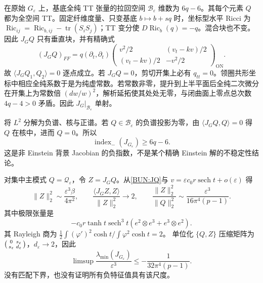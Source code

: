 \documentclass[UTF8,fontset=fandol,zihao=-4,oneside,openany]{ctexbook}
\theoremstyle{cjkplain}
\numberwithin{equation}{chapter}
\begin{document}
在原始 $G_\varepsilon$ 上，基底全纯 TT 张量的拉回空间
$\mathcal B_\varepsilon$ 维数为 $6q-6$。其每个元素 $Q$ 都为全空间 TT。固定纤维度量、只变基底 $b\mapsto b+s q$ 时，坐标型水平 Ricci 为
$\operatorname{Ric}_{ij}=\operatorname{Ric}_{b,ij}-\operatorname{tr}(S_iS_j)$；TT 变分使 $D\operatorname{Ric}_b(q)=-q$。混合块也不变。因此 $J_GQ$ 只有垂直块，并有精确式
\begin{equation}
 (J_GQ)_{FF}=q(\partial_t,\partial_t)
 \begin{pmatrix}v^2/2&(v_t-kv)/2\\(v_t-kv)/2&-v^2/2\end{pmatrix}_{\mathrm{ON}}.
 \label{BUN:JQ}
\end{equation}
故 $\langle J_GQ_1,Q_2\rangle=0$ 逐点成立。若 $J_GQ=0$，剪切开集上必有 $q_{tt}=0$。领圈共形坐标中相应全纯系数于是为纯虚常数。若常数非零，提升到上半平面后全纯二次微分在开集上为常数倍 $(dw/w)^2$，解析延拓使其处处无零，与闭曲面上零点总次数 $4q-4>0$ 矛盾。因此 $J_G|_{\mathcal B_\varepsilon}$ 单射。

将 $L^2$ 分解为负谱、核与正谱。若 $Q\in\mathcal B_\varepsilon$ 的负谱投影为零，由 $\langle J_GQ,Q\rangle=0$ 得 $Q$ 在核中，进而 $Q=0$。所以
\begin{equation}
 \operatorname{index}_-(J_{G_\varepsilon})\ge6q-6.
 \label{BUN:index}
\end{equation}
这是非 Einstein 背景 Jacobian 的负指数，不是某个精确 Einstein 解的不稳定性结论。

对集中主模式 $Q=\mathcal Q_\varepsilon$，令 $Z=J_GQ$。从\eqref{BUN:JQ}与 $v=\varepsilon c_0r\operatorname{sech}t+o(\varepsilon)$ 得
\[
 \|Z\|_2^2\sim\frac{\varepsilon^3\beta}{4\pi^2},\qquad
 \frac{\langle J_GZ,Z\rangle}{\|Z\|_2^2}\to2,
 \qquad \frac{\|Z\|_2^2}{\|Q\|_2^2}
 \sim\frac{\varepsilon^3}{16\pi^4(p-1)}.
\]
其中极限张量是
\[
 -c_0r\tanh t\operatorname{sech}^3t(e^2\otimes e^3+e^3\otimes e^2).
\]
其 Rayleigh 商为 $\frac12\int(\varphi')^2\cosh t/\int\varphi^2\cosh t=2$。
单位化 $\{Q,Z\}$ 压缩矩阵为
$\begin{psmallmatrix}0&s_\varepsilon\\s_\varepsilon&d_\varepsilon\end{psmallmatrix}$，$d_\varepsilon\to2$，因此
\begin{equation}
 \limsup\frac{\lambda_{\min}(J_{G_\varepsilon})}{\varepsilon^3}
 \le-\frac1{32\pi^4(p-1)}.
 \label{BUN:negative-ritz}
\end{equation}
没有匹配下界，也没有证明所有负特征值具有该尺度。
\end{document}
